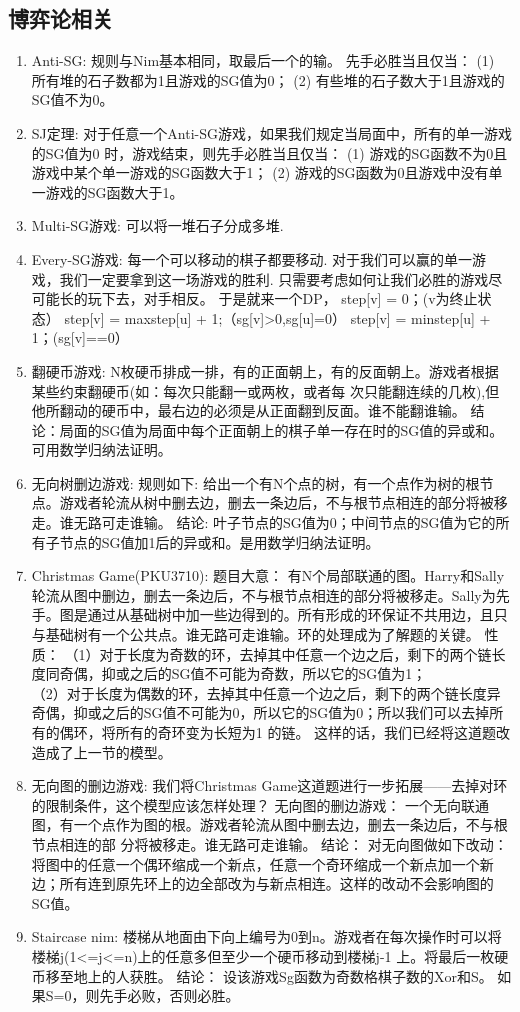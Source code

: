 \documentclass[11pt]{article}
\begin{document}
		\subsection{博弈论相关}
		\begin{enumerate}
	\item Anti-SG:
		规则与Nim基本相同，取最后一个的输。
		先手必胜当且仅当：
		(1) 所有堆的石子数都为1且游戏的SG值为0；
		(2) 有些堆的石子数大于1且游戏的SG值不为0。
	\item SJ定理:
		对于任意一个Anti-SG游戏，如果我们规定当局面中，所有的单一游戏的SG值为0 时，游戏结束，则先手必胜当且仅当：
		(1) 游戏的SG函数不为0且游戏中某个单一游戏的SG函数大于1；
		(2) 游戏的SG函数为0且游戏中没有单一游戏的SG函数大于1。
	\item Multi-SG游戏:
		可以将一堆石子分成多堆.
	\item Every-SG游戏:
		每一个可以移动的棋子都要移动.
		对于我们可以赢的单一游戏，我们一定要拿到这一场游戏的胜利.
		只需要考虑如何让我们必胜的游戏尽可能长的玩下去，对手相反。
		于是就来一个DP，
		step[v] = 0；(v为终止状态）
		step[v] = max{step[u]} + 1;（sg[v]>0,sg[u]=0）
		step[v] = min{step[u]} + 1；(sg[v]==0）
	\item 翻硬币游戏:
		N枚硬币排成一排，有的正面朝上，有的反面朝上。游戏者根据某些约束翻硬币(如：每次只能翻一或两枚，或者每 次只能翻连续的几枚),但他所翻动的硬币中，最右边的必须是从正面翻到反面。谁不能翻谁输。
		结论：局面的SG值为局面中每个正面朝上的棋子单一存在时的SG值的异或和。可用数学归纳法证明。
	\item 无向树删边游戏:
		规则如下:
		给出一个有N个点的树，有一个点作为树的根节点。游戏者轮流从树中删去边，删去一条边后，不与根节点相连的部分将被移走。谁无路可走谁输。
		结论:
		叶子节点的SG值为0；中间节点的SG值为它的所有子节点的SG值加1后的异或和。是用数学归纳法证明。
	\item Christmas Game(PKU3710):
		题目大意：
		有N个局部联通的图。Harry和Sally轮流从图中删边，删去一条边后，不与根节点相连的部分将被移走。Sally为先手。图是通过从基础树中加一些边得到的。所有形成的环保证不共用边，且只与基础树有一个公共点。谁无路可走谁输。环的处理成为了解题的关键。
		性质：
		（1）对于长度为奇数的环，去掉其中任意一个边之后，剩下的两个链长度同奇偶，抑或之后的SG值不可能为奇数，所以它的SG值为1；\\
		（2）对于长度为偶数的环，去掉其中任意一个边之后，剩下的两个链长度异奇偶，抑或之后的SG值不可能为0，所以它的SG值为0；所以我们可以去掉所有的偶环，将所有的奇环变为长短为1 的链。
		这样的话，我们已经将这道题改造成了上一节的模型。
	\item 无向图的删边游戏:
		我们将Christmas Game这道题进行一步拓展——去掉对环的限制条件，这个模型应该怎样处理？
		无向图的删边游戏：
		一个无向联通图，有一个点作为图的根。游戏者轮流从图中删去边，删去一条边后，不与根节点相连的部 分将被移走。谁无路可走谁输。
		结论：
		对无向图做如下改动：将图中的任意一个偶环缩成一个新点，任意一个奇环缩成一个新点加一个新边；所有连到原先环上的边全部改为与新点相连。这样的改动不会影响图的SG值。
	\item Staircase nim:
		楼梯从地面由下向上编号为0到n。游戏者在每次操作时可以将楼梯j(1<=j<=n)上的任意多但至少一个硬币移动到楼梯j-1 上。将最后一枚硬币移至地上的人获胜。
		结论：
		设该游戏Sg函数为奇数格棋子数的Xor和S。
		如果S=0，则先手必败，否则必胜。
	\end{enumerate}
\end{document}
